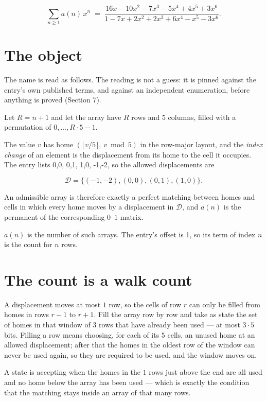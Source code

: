 \documentclass[11pt]{article}
\theoremstyle{definition}
\begin{document}
\[\sum_{n \ge 1} a(n)\,x^n \;=\; \frac{16x - 10x^{2} - 7x^{3} - 5x^{4} + 4x^{5} + 3x^{6}}{1 - 7x + 2x^{2} + 2x^{3} + 6x^{4} - x^{5} - 3x^{6}}.\]

\section{The object}

The name is read as follows. The reading is not a guess: it is pinned against the entry's own published terms, and against an independent enumeration, before anything is proved (Section 7).

Let $R = n + 1$ and let the array have $R$ rows and $5$ columns, filled with a permutation of $0,\dots,R\cdot5-1$.

The value $v$ has home $(\lfloor v/5\rfloor,\ v \bmod 5)$ in the row-major layout, and the {\itshape index change} of an element is the displacement from its home to the cell it occupies. The entry lists 0,0, 0,1, 1,0, -1,-2, so the allowed displacements are

\[\mathcal{D} = \{(-1,-2), (0,0), (0,1), (1,0)\}.\]

An admissible array is therefore exactly a perfect matching between homes and cells in which every home moves by a displacement in $\mathcal{D}$, and $a(n)$ is the permanent of the corresponding $0$--$1$ matrix.

$a(n)$ is the number of such arrays. The entry's offset is 1, so its term of index $n$ is the count for $n$ rows.

\section{The count is a walk count}

A displacement moves at most $1$ row, so the cells of row $r$ can only be filled from homes in rows $r-1$ to $r+1$. Fill the array row by row and take as state the set of homes in that window of $3$ rows that have already been used --- at most $3\cdot5$ bits. Filling a row means choosing, for each of its $5$ cells, an unused home at an allowed displacement; after that the homes in the oldest row of the window can never be used again, so they are required to be used, and the window moves on.

A state is accepting when the homes in the $1$ rows just above the end are all used and no home below the array has been used --- which is exactly the condition that the matching stays inside an array of that many rows.
\end{document}
